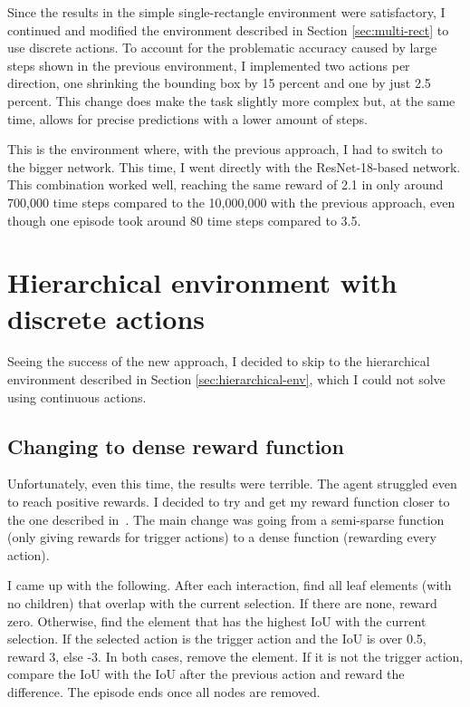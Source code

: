 \documentclass[
  digital,     %
  oneside,     %
  nosansbold,  %
  nocolorbold, %
  lof,         %
  lot,         %
]{fithesis4}
\begin{document}
Since the results in the simple single-rectangle environment were satisfactory, I continued and modified the environment described in Section \ref{sec:multi-rect} to use discrete actions. To account for the problematic accuracy caused by large steps shown in the previous environment, I implemented two actions per direction, one shrinking the bounding box by 15 percent and one by just 2.5 percent. This change does make the task slightly more complex but, at the same time, allows for precise predictions with a lower amount of steps.

This is the environment where, with the previous approach, I had to switch to the bigger network. This time, I went directly with the ResNet-18-based network. This combination worked well, reaching the same reward of 2.1 in only around 700,000 time steps compared to the 10,000,000 with the previous approach, even though one episode took around 80 time steps compared to 3.5.

\section{Hierarchical environment with discrete actions}

Seeing the success of the new approach, I decided to skip to the hierarchical environment described in Section \ref{sec:hierarchical-env}, which I could not solve using continuous actions.

\subsection{Changing to dense reward function}

Unfortunately, even this time, the results were terrible. The agent struggled even to reach positive rewards. I decided to try and get my reward function closer to the one described in~\cite{iterative_od_with_rl}. The main change was going from a semi-sparse function (only giving rewards for trigger actions) to a dense function (rewarding every action).

I came up with the following. After each interaction, find all leaf elements (with no children) that overlap with the current selection. If there are none, reward zero. Otherwise, find the element that has the highest IoU with the current selection. If the selected action is the trigger action and the IoU is over 0.5, reward 3, else -3. In both cases, remove the element. If it is not the trigger action, compare the IoU with the IoU after the previous action and reward the difference. The episode ends once all nodes are removed.
\end{document}
